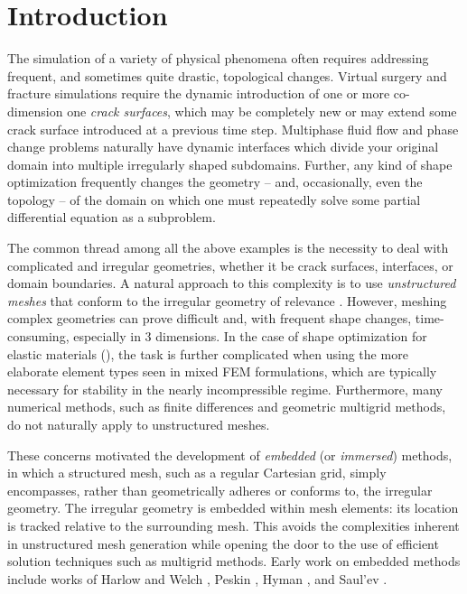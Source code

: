 %

\part{Introduction} \label{pt:introduction}

The simulation of a variety of physical phenomena often requires addressing frequent, and sometimes quite drastic, topological changes. Virtual surgery and fracture simulations require the dynamic introduction of one or more co-dimension one \emph{crack surfaces}, which may be completely new or may extend some crack surface introduced at a previous time step. Multiphase fluid flow and phase change problems naturally have dynamic interfaces which divide your original domain into multiple irregularly shaped subdomains. Further, any kind of shape optimization frequently changes the geometry -- and, occasionally, even the topology -- of the domain on which one must repeatedly solve some partial differential equation as a subproblem.

The common thread among all the above examples is the necessity to deal with complicated and irregular geometries, whether it be crack surfaces, interfaces, or domain boundaries. A natural approach to this complexity is to use \emph{unstructured meshes} that conform to the irregular geometry of relevance \cite{Babuska70, Bramble96, Chen.Zhiming96, Dryja05, Cockburn09, Wohlmuth99, Huang02, Lamichhane04}. However, meshing complex geometries can prove difficult and, with frequent shape changes, time-consuming, especially in $3$ dimensions. In the case of shape optimization for elastic materials (\cite{Sethian00, Osher01, Allaire04, Duysinx06, Challis08, Wei.Peng08}), the task is further complicated when using the more elaborate element types seen in mixed FEM formulations, which are typically necessary for stability in the nearly incompressible regime. Furthermore, many numerical methods, such as finite differences and geometric multigrid methods, do not naturally apply to unstructured meshes.

These concerns motivated the development of \emph{embedded} (or \emph{immersed}) methods, in which a structured mesh, such as a regular Cartesian grid, simply encompasses, rather than geometrically adheres or conforms to, the irregular geometry. The irregular geometry is embedded within mesh elements: its location is tracked relative to the surrounding mesh. This avoids the complexities inherent in unstructured mesh generation while opening the door to the use of efficient solution techniques such as multigrid methods. Early work on embedded methods include works of Harlow and Welch \cite{Harlow65}, Peskin \cite{Peskin72}, Hyman \cite{Hyman52}, and Saul'ev \cite{Saul'ev63}.

